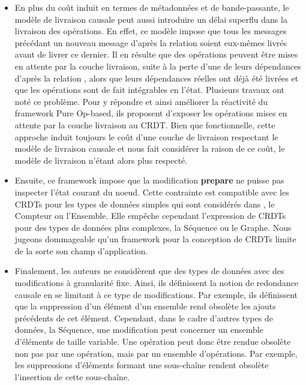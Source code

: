 \begin{itemize}
    \item En plus du coût induit en termes de métadonnées et de bande-passante, le modèle de livraison causale peut aussi introduire un délai superflu dans la livraison des opérations.
        En effet, ce modèle impose que tous les messages précédant un nouveau message d'après la relation \hb soient eux-mêmes livrés avant de livrer ce dernier.
        Il en résulte que des opérations peuvent être mises en attente par la couche livraison, \eg suite à la perte d'une de leurs dépendances d'après la relation \hb, alors que leurs dépendances réelles ont déjà été livrées et que les opérations sont de fait intégrables en l'état.
        Plusieurs travaux \cite{2020-flec-bauwens,2021-improving-reactivity-pure-op-based-crdts-bauwens} ont noté ce problème.
        Pour y répondre et ainsi améliorer la réactivité du framework Pure Op-based, ils proposent d'exposer les opérations mises en attente par la couche livraison au \ac{CRDT}.
        Bien que fonctionnelle, cette approche induit toujours le coût d'une couche de livraison respectant le modèle de livraison causale et nous fait considérer la raison de ce coût, le modèle de livraison n'étant alors plus respecté.
    \item Ensuite, ce framework impose que la modification \textbf{prepare} ne puisse pas inspecter l'état courant du noeud.
        Cette contrainte est compatible avec les \acp{CRDT} pour les types de données simples qui sont considérés dans \cite{baquero2017pure}, \eg le Compteur ou l'Ensemble.
        Elle empêche cependant l'expression de \acp{CRDT} pour des types de données plus complexes, \eg la Séquence ou le Graphe.
        Nous jugeons dommageable qu'un framework pour la conception de \acp{CRDT} limite de la sorte son champ d'application.
    \item Finalement, les auteurs ne considèrent que des types de données avec des modifications à granularité fixe.
        Ainsi, ils définissent la notion de redondance causale en se limitant à ce type de modifications.
        Par exemple, ils définissent que la suppression d'un élément d'un ensemble rend obsolète les ajouts précédents de cet élément.
        Cependant, dans le cadre d'autres types de données, \eg la Séquence, une modification peut concerner un ensemble d'éléments de taille variable.
        Une opération peut donc être rendue obsolète non pas par une opération, mais par un ensemble d'opérations.
        Par exemple, les suppressions d'éléments formant une sous-chaîne rendent obsolète l'insertion de cette sous-chaîne.

\end{itemize}
